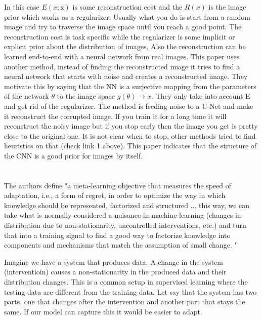 \documentclass{article}
\newcommand{\citeall}[1]{\citeauthor{#1}}
\begin{document}
In this case $E(x ; \dot{\mathrm{x}})$ is some reconstruction cost and the $R(x)$ is the image prior which works as a regularizer. Usually what you do is start from a random image and try to traverse the image space until you reach a good point. The reconstruction cost is task specific while the regularizer is some implicit or explicit prior about the distribution of images. Also the reconstruction can be learned end-to-end with a neural network from real images. This paper uses another method, instead of finding the reconstructed image it tries to find a neural network that starts with noise and creates a reconstructed image. They motivate this by saying that the NN is a surjective mapping from the parameters of the network $\theta$ to the image space $g(\theta) \rightarrow x$. They only take into account E and get rid of the regularizer. The method is feeding noise to a U-Net and make it reconstruct the corrupted image. If you train it for a long time it will reconstruct the noisy image but if you stop early then the image you get is pretty close to the original one. It is not clear when to stop, other methods tried to find heuristics on that (check link 1 above). This paper indicates that the structure of the CNN is a good prior for images by itself.

\section{\citeall{Bengio2019AMechanisms}}

The authors define "a meta-learning objective that measures the speed of adaptation, i.e., a form of regret, in order to optimize the way in which knowledge should be represented, factorized and structured ... this way, we can take what is normally considered a nuisance in machine learning (changes in distribution due to non-stationarity, uncontrolled interventions, etc.) and turn that into a training signal to find a good way to factorize knowledge into components and mechanisms that match the assumption of small change. "

Imagine we have a system that produces data. A change in the system (interventioin) causes a non-stationarity in the produced data and their distribution changes. This is a common setup in supervised learning where the testing data are different from the training data. Let say that the system has two parts, one that changes after the intervention and another part that stays the same. If our model can capture this it would be easier to adapt.
\end{document}
